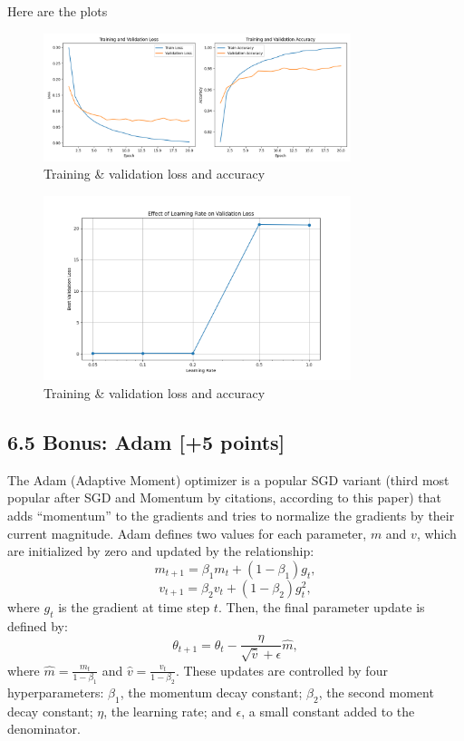 \documentclass[a3paper,12pt]{extarticle} %
\begin{document}
Here are the plots 
\begin{figure}[h!]
    \centering
    \includegraphics[width=0.8\textwidth]{test-shida/hw3q6/training_curves.png}
    \caption{Training \& validation loss and accuracy}
    \label{fig:primal}
\end{figure}  
\begin{figure}[h!]
    \centering
    \includegraphics[width=0.8\textwidth]{test-shida/hw3q6/learning_rate_comparison.png}
    \caption{Training \& validation loss and accuracy}
    \label{fig:primal}
\end{figure}
\subsection*{6.5 Bonus: Adam [+5 points]}
The Adam (Adaptive Moment) optimizer is a popular SGD variant (third most popular after SGD and Momentum by citations, according to this paper) that adds “momentum” to the gradients and tries to normalize the gradients by their current magnitude. Adam defines two values for each parameter, $m$ and $v$, which are initialized by zero and updated by the relationship:
\[
m_{t+1} = \beta_1 m_t + (1 - \beta_1) g_t,
\]
\[
v_{t+1} = \beta_2 v_t + (1 - \beta_2) g_t^2,
\]
where $g_t$ is the gradient at time step $t$. Then, the final parameter update is defined by:
\[
\theta_{t+1} = \theta_t - \frac{\eta}{\sqrt{\hat{v}} + \epsilon} \hat{m},
\]
where $\hat{m} = \frac{m_t}{1 - \beta_1}$ and $\hat{v} = \frac{v_t}{1 - \beta_2}$. These updates are controlled by four hyperparameters: $\beta_1$, the momentum decay constant; $\beta_2$, the second moment decay constant; $\eta$, the learning rate; and $\epsilon$, a small constant added to the denominator.
\end{document}
